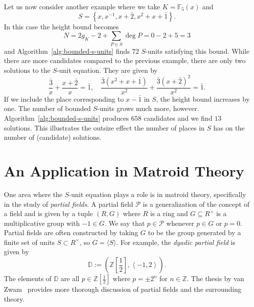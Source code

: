 \begin{example}%
  \label{ex:finite-field}
  Let us now consider another example where we take \(K = \mathbb{F}_{5}(x)\) and
  \[S = \left\{ x, x^{-1}, x + \bar{2}, x^{2} + x + \bar{1} \right\}.\]
  In this case the height bound becomes
  \[N = 2g_{K} - 2 + \sum_{P \in S} \deg{P} = 0 - 2 + 5 = 3\]
  and Algorithm~\ref{alg:bounded-s-units} finds \(72\) \(S\)-units satisfying this bound. While there are more candidates compared to the previous example, there are only two solutions to the \(S\)-unit equation. They are given by
  \[\frac{\bar{3}}{x}  + \frac{x + \bar{2}}{x} = \bar{1}, \quad \frac{\bar{3}(x^{2} + x + \bar{1})}{x^{2}} + \frac{\bar{3}{(x + \bar{2})}^{2}}{x^{2}} = \bar{1}.\]
  If we include the place corresponding to \(x - \bar{1}\) in \(S\), the height bound increases by one. The number of bounded \(S\)-units grows much more, however. Algorithm~\ref{alg:bounded-s-units} produces \(658\) candidates and we find \(13\) solutions. This illustrates the outsize effect the number of places in \(S\) has on the number of (candidate) solutions.
\end{example}

\section{An Application in Matroid Theory}%
\label{sec:an-application-in-matroid-theory}

One area where the \(S\)-unit equation plays a role is in matroid theory, specifically in the study of \textit{partial fields}. A partial field \(\mathcal{P}\) is a generalization of the concept of a field and is given by a tuple \((R, G)\) where \(R\) is a ring and \(G \subseteq R^{\times}\) is a multiplicative group with \(-1 \in G\). We say that \(p \in \mathcal{P}\) whenever \(p \in G\) or \(p = 0\). Partial fields are often constructed by taking \(G\) to be the group generated by a finite set of units \(S \subset R^{\times}\), so \(G = \langle S \rangle\). For example, the \textit{dyadic partial field} is given by
\[\mathbb{D} := \left( \mathbb{Z} \left[ \frac{1}{2} \right], \left\langle -1, 2 \right\rangle \right).\]
The elements of \(\mathbb{D}\) are all \(p \in \mathbb{Z} \left[ \frac{1}{2} \right]\) where \(p = \pm 2^{n}\) for \(n \in \mathbb{Z}\). The thesis by van Zwam~\cite{zwam-2009-partial-fields-in} provides more thorough discussion of partial fields and the surrounding theory.

